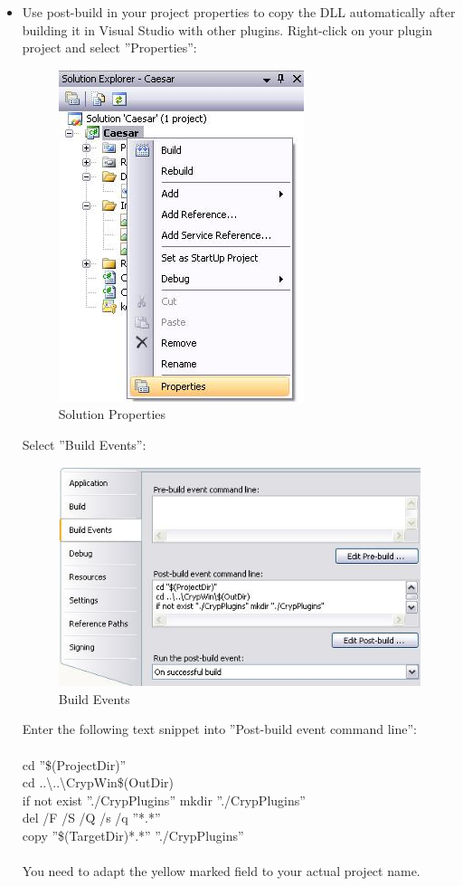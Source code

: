 \begin{itemize}
	\item Use post-build in your project properties to copy the DLL automatically after building it in Visual Studio with other plugins. Right-click on your plugin project and select ''Properties'':
\begin{figure}[h]
	\centering
		\includegraphics{figures/solution_properties.JPG}
	\caption{Solution Properties}
	\label{fig:solution_properties}
\end{figure}\clearpage
Select ''Build Events'':
\begin{figure}[h]
	\centering
		\includegraphics{figures/post_build.JPG}
	\caption{Build Events}
	\label{fig:post_build}
\end{figure}

Enter the following text snippet into ''Post-build event command line'':\\\\
cd ''\$(ProjectDir)''\\
cd ..\textbackslash ..\textbackslash CrypWin\$(OutDir)\\
if not exist ''./CrypPlugins'' mkdir ''./CrypPlugins''\\
del /F /S /Q /s /q ''*.*''\\
copy ''\$(TargetDir)*.*'' ''./CrypPlugins''\\\\
You need to adapt the yellow marked field to your actual project name.
\end{itemize}


